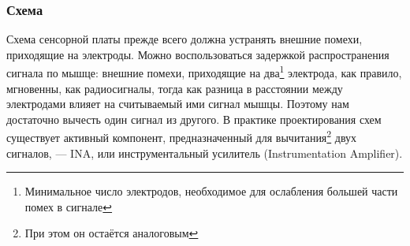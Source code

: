 \documentclass[a4paper, 10pt, final]{article} %
\begin{document}
    \subsubsection{Схема} \label{sec:SensorBoardSchematic}
    Схема сенсорной платы прежде всего должна устранять внешние помехи, приходящие на электроды.
    Можно воспользоваться задержкой распространения сигнала по мышце: внешние помехи, приходящие на два\footnote{Минимальное число электродов, необходимое для ослабления большей части помех в сигнале} электрода, как правило, мгновенны, как радиосигналы, тогда как разница в расстоянии между электродами влияет на считываемый ими сигнал мышцы.
    Поэтому нам достаточно вычесть один сигнал из другого.
    В практике проектирования схем существует активный компонент, предназначенный для вычитания\footnote{При этом он остаётся аналоговым} двух сигналов, --- INA, или инструментальный усилитель (Instrumentation Amplifier).
\end{document}
